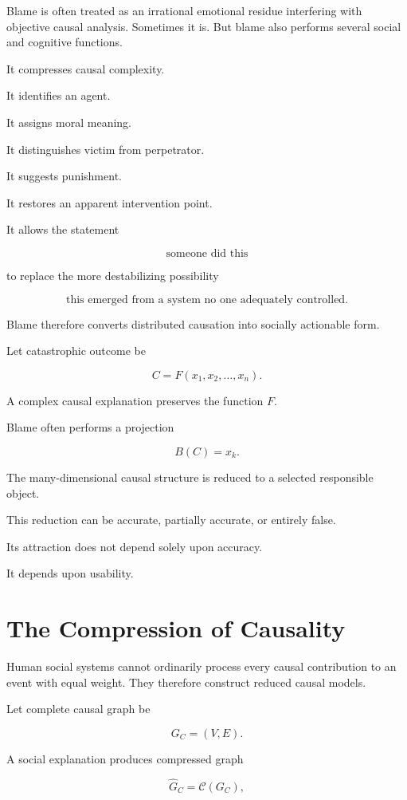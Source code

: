 \documentclass[11pt,oneside]{book}
\theoremstyle{definition}
\theoremstyle{remark}
\begin{document}
Blame is often treated as an irrational emotional residue interfering with objective causal analysis. Sometimes it is. But blame also performs several social and cognitive functions.

It compresses causal complexity.

It identifies an agent.

It assigns moral meaning.

It distinguishes victim from perpetrator.

It suggests punishment.

It restores an apparent intervention point.

It allows the statement

\[
\text{someone did this}
\]

to replace the more destabilizing possibility

\[
\text{this emerged from a system no one adequately controlled}.
\]

Blame therefore converts distributed causation into socially actionable form.

Let catastrophic outcome be

\[
C=F(x_1,x_2,\ldots,x_n).
\]

A complex causal explanation preserves the function \(F\).

Blame often performs a projection

\[
B(C)=x_k.
\]

The many-dimensional causal structure is reduced to a selected responsible object.

This reduction can be accurate, partially accurate, or entirely false.

Its attraction does not depend solely upon accuracy.

It depends upon usability.

\section{The Compression of Causality}

Human social systems cannot ordinarily process every causal contribution to an event with equal weight. They therefore construct reduced causal models.

Let complete causal graph be

\[
G_C=(V,E).
\]

A social explanation produces compressed graph

\[
\widehat G_C
=
\mathcal C(G_C),
\]
\end{document}
